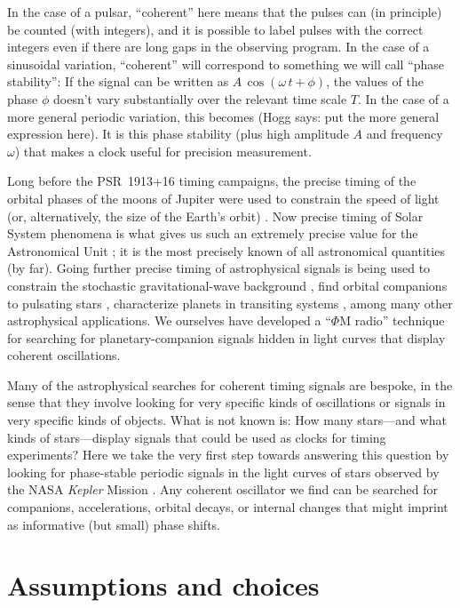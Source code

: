 \documentclass{article}
\newcommand{\hogg}[1]{{\color{blue} (Hogg says: #1)}}
\begin{document}
In the case of a pulsar, ``coherent'' here means that the pulses can (in principle) be counted (with integers), and it is possible to label pulses with the correct integers even if there are long gaps in the observing program.
In the case of a sinusoidal variation, 
``coherent'' will correspond to something we will call ``phase stability'':
If the signal can be written as $A\,\cos(\omega\,t+\phi)$, the values of the phase $\phi$ doesn't vary substantially over the relevant time scale $T$.
In the case of a more general periodic variation, this becomes \hogg{put the more general expression here}.
It is this phase stability (plus high amplitude $A$ and frequency $\omega$) that makes a clock useful for precision measurement.

Long before the PSR~1913+16 timing campaigns, the precise timing of the orbital phases of the moons of Jupiter were used to constrain the speed of light (or, alternatively, the size of the Earth's orbit) \cite{roemer}.
Now precise timing of Solar System phenomena is what gives us such an extremely precise value for the Astronomical Unit \cite{au}; it is the most precisely known of all astronomical quantities (by far).
Going further precise timing of astrophysical signals is being used to constrain the stochastic gravitational-wave background \cite{pta}, find orbital companions to pulsating stars \cite{murphy}, characterize planets in transiting systems \cite{ttvs}, among many other astrophysical applications.
We ourselves have developed a ``$\Phi$M radio'' technique \cite{phimradio} for searching for planetary-companion signals hidden in light curves that display coherent oscillations.

Many of the astrophysical searches for coherent timing signals are bespoke, in the sense that they involve looking for very specific kinds of oscillations or signals in very specific kinds of objects.
What is not known is: How many stars---and what kinds of stars---display signals that could be used as clocks for timing experiments?
Here we take the very first step towards answering this question by looking for phase-stable periodic signals in the light curves of stars observed by the NASA \textsl{Kepler} Mission \cite{kepler}.
Any coherent oscillator we find can be searched for companions, accelerations, orbital decays, or internal changes that might imprint as informative (but small) phase shifts.

\section{Assumptions and choices}
\end{document}
